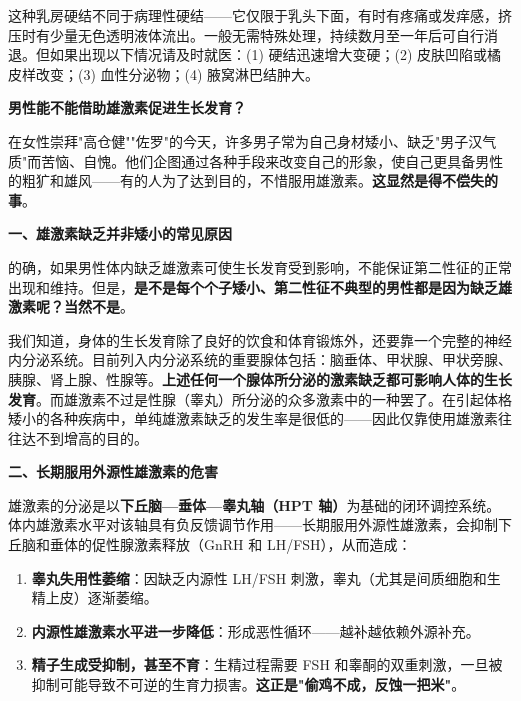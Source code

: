 \begin{tcolorbox}[colback=pink!5!white,colframe=red!50!black,title=贴心小叮咛]
这种乳房硬结不同于病理性硬结——它仅限于乳头下面，有时有疼痛或发痒感，挤压时有少量无色透明液体流出。一般无需特殊处理，持续数月至一年后可自行消退。但如果出现以下情况请及时就医：(1) 硬结迅速增大变硬；(2) 皮肤凹陷或橘皮样改变；(3) 血性分泌物；(4) 腋窝淋巴结肿大。
\end{tcolorbox}

\vspace{0.8em}
\noindent\textbf{男性能不能借助雄激素促进生长发育？}

在女性崇拜"高仓健""佐罗"的今天，许多男子常为自己身材矮小、缺乏"男子汉气质"而苦恼、自愧。他们企图通过各种手段来改变自己的形象，使自己更具备男性的粗犷和雄风——有的人为了达到目的，不惜服用雄激素。\textbf{这显然是得不偿失的事}。

\vspace{0.5em}
\noindent\textbf{一、雄激素缺乏并非矮小的常见原因}

的确，如果男性体内缺乏雄激素可使生长发育受到影响，不能保证第二性征的正常出现和维持。但是，\textbf{是不是每个个子矮小、第二性征不典型的男性都是因为缺乏雄激素呢？当然不是}。

我们知道，身体的生长发育除了良好的饮食和体育锻炼外，还要靠一个完整的神经内分泌系统。目前列入内分泌系统的重要腺体包括：脑垂体、甲状腺、甲状旁腺、胰腺、肾上腺、性腺等。\textbf{上述任何一个腺体所分泌的激素缺乏都可影响人体的生长发育}。而雄激素不过是性腺（睾丸）所分泌的众多激素中的一种罢了。在引起体格矮小的各种疾病中，单纯雄激素缺乏的发生率是很低的——因此仅靠使用雄激素往往达不到增高的目的。

\vspace{0.5em}
\noindent\textbf{二、长期服用外源性雄激素的危害}

雄激素的分泌是以\textbf{下丘脑—垂体—睾丸轴（HPT 轴）}为基础的闭环调控系统。体内雄激素水平对该轴具有负反馈调节作用——长期服用外源性雄激素，会抑制下丘脑和垂体的促性腺激素释放（GnRH 和 LH/FSH），从而造成：

\begin{enumerate}
	\item \textbf{睾丸失用性萎缩}：因缺乏内源性 LH/FSH 刺激，睾丸（尤其是间质细胞和生精上皮）逐渐萎缩。
	\item \textbf{内源性雄激素水平进一步降低}：形成恶性循环——越补越依赖外源补充。
	\item \textbf{精子生成受抑制，甚至不育}：生精过程需要 FSH 和睾酮的双重刺激，一旦被抑制可能导致不可逆的生育力损害。\textbf{这正是"偷鸡不成，反蚀一把米"}。
\end{enumerate}

